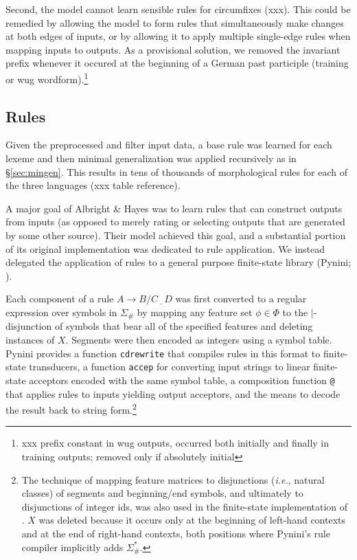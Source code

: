 \documentclass[11pt]{article}
\begin{document}
Second, the model cannot learn sensible rules for circumfixes (xxx). This could be remedied by allowing the model to form rules that simultaneously make changes at both edges of inputs, or by allowing it to apply multiple single-edge rules when mapping inputs to outputs. As a provisional solution, we removed the invariant prefix  whenever it occured at the beginning of a German past participle (training or wug wordform).\footnote{xxx prefix constant in wug outputs, occurred both initially and finally in training outputs; removed only if absolutely initial}

\subsection{Rules}

Given the preprocessed and filter input data, a base rule was learned for each lexeme and then minimal generalization was applied recursively as in \S\ref{sec:mingen}. This results in tens of thousands of morphological rules for each of the three languages (xxx table reference).

A major goal of Albright \& Hayes was to learn rules that can construct outputs from inputs (as opposed to merely rating or selecting outputs that are generated by some other source). Their model achieved this goal, and a substantial portion of its original implementation was dedicated to rule application. We instead delegated the application of rules to a general purpose finite-state library (Pynini; \citealp{gorman-2016-pynini, gorman2021}).

Each component of a rule $A \to B / C \underline{\ \ \ } D$ was first converted to a regular expression over symbols in $\Sigma_{\#}$ by mapping any feature set $\phi \in \Phi$ to the $|$-disjunction of symbols that bear all of the specified features and deleting instances of $X$. Segments were then encoded as integers using a symbol table. Pynini provides a function \texttt{cdrewrite} that compiles rules in this format to finite-state transducers, a function \texttt{accep} for converting input strings to linear finite-state acceptors encoded with the same symbol table, a composition function \texttt{@} that applies rules to inputs yielding output acceptors, and the means to decode the result back to string form.\footnote{The technique of mapping feature matrices to disjunctions (\emph{i.e.}, natural classes) of segments and beginning/end symbols, and ultimately to disjunctions of integer ids, was also used in the finite-state implementation of \citet{hayes2008}. $X$ was deleted because it occurs only at the beginning of left-hand contexts and at the end of right-hand contexts, both positions where Pynini's rule compiler implicitly adds $\Sigma_{\#}^*$.}
\end{document}
